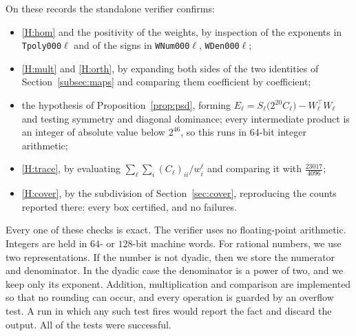 \documentclass[reqno]{amsart}
\theoremstyle{definition}
\begin{document}
On these records the standalone verifier confirms:
\begin{itemize}[leftmargin=1.4em]
\item \ref{H:hom} and the positivity of the weights, by inspection of the exponents in
\texttt{Tpoly000$\ell$} and of the signs in \texttt{WNum000$\ell$}, \texttt{WDen000$\ell$};
\item \ref{H:mult} and \ref{H:orth}, by expanding both sides of the two identities of
Section~\ref{subsec:maps} and comparing them coefficient by coefficient;
\item the hypothesis of Proposition~\ref{prop:psd}, forming
$E_\ell=S_\ell\bigl(2^{20}C_\ell\bigr)-W_\ell^{\top}W_\ell$ and testing symmetry and diagonal
dominance; every intermediate product is an integer of absolute value below $2^{46}$, so this runs
in $64$-bit integer arithmetic;
\item \ref{H:trace}, by evaluating $\sum_{\ell}\sum_i (C_\ell)_{ii}/w^\ell_i$ and comparing it with
$\tfrac{23017}{4096}$;
\item \ref{H:cover}, by the subdivision of Section~\ref{sec:cover}, reproducing the counts reported
there: every box certified, and no failures.
\end{itemize}

Every one of these checks is exact. The verifier uses no floating-point arithmetic. Integers are
held in $64$- or $128$-bit machine words. For rational numbers, we use two representations. If the number is not dyadic, then we 
store the numerator and denominator. In the dyadic case the denominator is a power of two, and we keep only its exponent. Addition, multiplication and comparison are implemented so that no rounding can occur, and every
operation is guarded by an overflow test. A run in which any such test fires would report the fact and
discard the output. All of the tests were successful. 
\end{document}
